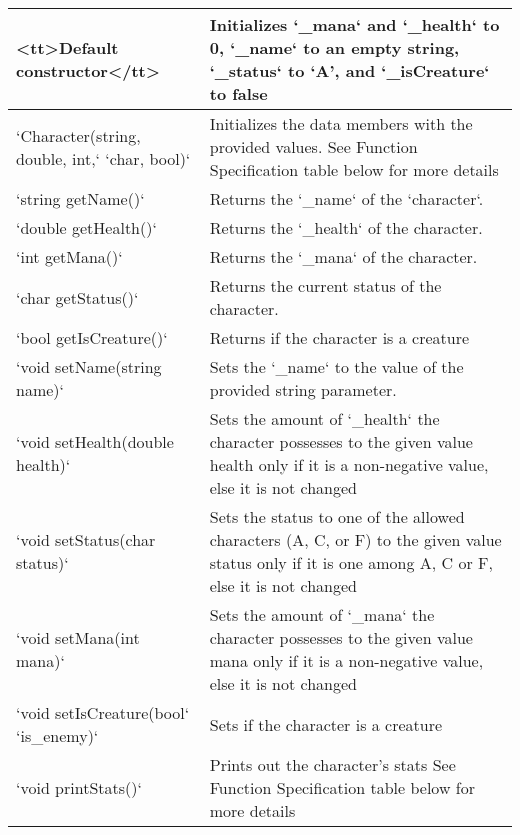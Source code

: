 {{{{{{{{{{{\begin{longtable}{|p{2.0in}|p{4.0in}|}
<tt>Default constructor</tt> & Initializes `_mana` and `_health` to 0, `_name` to an empty string, `_status` to `A', and `_isCreature` to false \\ \hline

`Character(string, double, int,` \newline `char, bool)` & Initializes the data members with the provided values.
See Function Specification table below for more details \\ \hline

`string getName()` & Returns the `_name` of the `character`. \\ \hline

`double getHealth()` & Returns the `_health` of the character. \\ \hline

`int getMana()` & Returns the `_mana` of the character. \\ \hline

`char getStatus()` & Returns the current status of the character. \\ \hline

`bool getIsCreature()` & Returns if the character is a creature\\ \hline

`void setName(string name)` & Sets the `_name` to the value of the provided string parameter. \\ \hline

`void setHealth(double health)` & Sets the amount of `_health` the character possesses to the given value health only if it is a non-negative value, else it is not changed \\ \hline

`void setStatus(char status)` & Sets the status to one of the allowed characters (A, C, or F) to the given value status only if it is one among A, C or F, else it is not changed \\ \hline

`void setMana(int mana)` & Sets the amount of `_mana` the character possesses to the given value mana only if it is a non-negative value, else it is not changed \\ \hline

`void setIsCreature(bool` \newline `is_enemy)` & Sets if the character is a creature \\ \hline

`void printStats()` & Prints out the character's stats
See Function Specification table below for more details
 \\ \hline


\end{longtable}}}}}}}}}}}}
